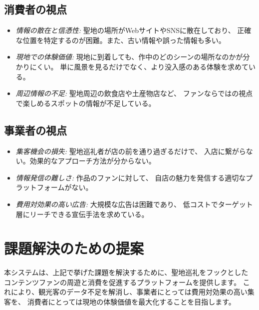 \documentclass{docs}
\begin{document}
\subsection{消費者の視点}
\begin{itemize}
	\item \emph{情報の散在と信憑性:} 聖地の場所がWebサイトやSNSに散在しており、
	正確な位置を特定するのが困難。また、古い情報や誤った情報も多い。
	\item \emph{現地での体験価値:} 現地に到着しても、作中のどのシーンの場所なのかが分かりにくい。
	単に風景を見るだけでなく、より没入感のある体験を求めている。
	\item \emph{周辺情報の不足:} 聖地周辺の飲食店や土産物店など、
	ファンならではの視点で楽しめるスポットの情報が不足している。
\end{itemize}


\subsection{事業者の視点}
\begin{itemize}
	\item \emph{集客機会の損失:} 聖地巡礼者が店の前を通り過ぎるだけで、
	入店に繋がらない。効果的なアプローチ方法が分からない。
	\item \emph{情報発信の難しさ:} 作品のファンに対して、
	自店の魅力を発信する適切なプラットフォームがない。
	\item \emph{費用対効果の高い広告:} 大規模な広告は困難であり、
	低コストでターゲット層にリーチできる宣伝手法を求めている。
\end{itemize}

\section{課題解決のための提案}

本システムは、上記で挙げた課題を解決するために、聖地巡礼をフックとした
コンテンツファンの周遊と消費を促進するプラットフォームを提供します。
これにより、観光客のデータ不足を解消し、事業者にとっては費用対効果の高い集客を、
消費者にとっては現地の体験価値を最大化することを目指します。

\end{document}

